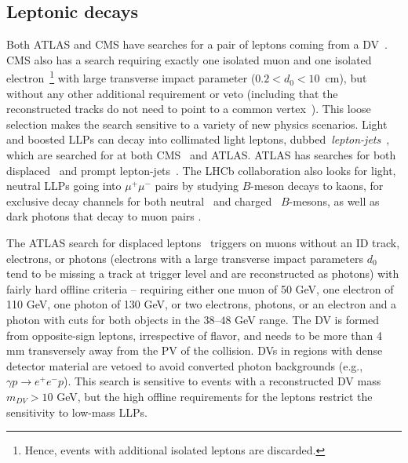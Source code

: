 \subsection{Leptonic decays}
\label{subsec:dleptons}

Both ATLAS and CMS have searches for a pair of leptons coming from a DV~\cite{Aad:2015rba,CMS:2014hka,CMS:2015pca}. CMS also has a search requiring exactly one isolated muon and one isolated electron~\footnote{Hence, events with additional isolated leptons are discarded.} with large transverse impact parameter ($0.2 < d_{0} < 10$~cm), but without any other additional requirement or veto (including that the reconstructed tracks do not need to point to a common vertex~\cite{CMS-PAS-EXO-16-022}). This loose selection makes the search sensitive to a variety of new physics scenarios. Light and boosted LLPs can decay into collimated light leptons, dubbed~\emph{lepton-jets}~\cite{ArkaniHamed:2008qp}, which are searched for at both CMS~\cite{Khachatryan:2015wka} and ATLAS.  ATLAS has searches for both displaced~\cite{Aad:2014yea,ATLAS-CONF-2016-042} and prompt lepton-jets~\cite{Aad:2015sms}.  The LHCb collaboration also looks for light, neutral LLPs going into $\mu^+ \mu^-$ pairs by studying $B$-meson decays to kaons, for exclusive decay channels for both neutral~\cite{Aaij:2015tna} and charged~\cite{Aaij:2016qsm} $B$-mesons, as well as dark photons that decay to muon pairs \cite{Aaij:2017rft}. 

The ATLAS search for displaced leptons~\cite{Aad:2015rba} triggers on muons without an ID track, electrons, or photons (electrons with a large transverse impact parameters $d_0$ tend to be missing a track at trigger level and are reconstructed as photons) with fairly hard offline \pT criteria -- requiring either one muon of 50 GeV, one electron of 110 GeV, one photon of 130 GeV, or two electrons, photons, or an electron and a photon with \pT cuts for both objects in the $38$--$48$ GeV range.  The DV is formed from opposite-sign leptons, irrespective of flavor, and needs to be more than 4 mm transversely away from the PV of the collision.  DVs in regions with dense detector material are vetoed to avoid converted photon backgrounds (e.g., $\gamma p\to e^+ e^-p$).  This search is sensitive to events with a reconstructed DV mass $m_{DV}>10$ GeV, but the high offline \pT requirements for the leptons restrict the sensitivity to low-mass LLPs.


